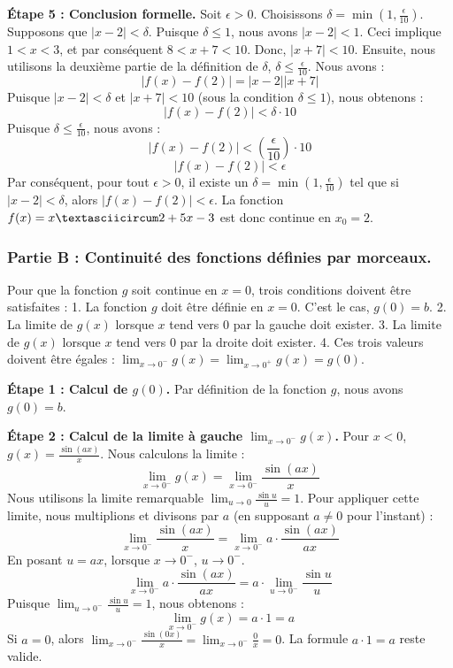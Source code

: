 \documentclass[12pt,a4paper]{report}
\begin{document}
\textbf{Étape 5 : Conclusion formelle.}
Soit $\epsilon > 0$.
Choisissons $\delta = \min\left(1, \frac{\epsilon}{10}\right)$.
Supposons que $|x - 2| < \delta$.
Puisque $\delta \le 1$, nous avons $|x - 2| < 1$.
Ceci implique $1 < x < 3$, et par conséquent $8 < x+7 < 10$.
Donc, $|x+7| < 10$.
Ensuite, nous utilisons la deuxième partie de la définition de $\delta$, $\delta \le \frac{\epsilon}{10}$.
Nous avons :
$$
|f(x) - f(2)| = |x-2||x+7|
$$
Puisque $|x-2| < \delta$ et $|x+7| < 10$ (sous la condition $\delta \le 1$), nous obtenons :
$$
|f(x) - f(2)| < \delta \cdot 10
$$
Puisque $\delta \le \frac{\epsilon}{10}$, nous avons :
$$
|f(x) - f(2)| < \left(\frac{\epsilon}{10}\right) \cdot 10
$$
$$
|f(x) - f(2)| < \epsilon
$$
Par conséquent, pour tout $\epsilon > 0$, il existe un $\delta = \min\left(1, \frac{\epsilon}{10}\right)$ tel que si $|x - 2| < \delta$, alors $|f(x) - f(2)| < \epsilon$.
La fonction $f(x) = x\textasciicircum 2 + 5x - 3$ est donc continue en $x_0 = 2$.

\subsubsection{Partie B : Continuité des fonctions définies par morceaux.}

Pour que la fonction $g$ soit continue en $x=0$, trois conditions doivent être satisfaites :
1.  La fonction $g$ doit être définie en $x=0$. C'est le cas, $g(0) = b$.
2.  La limite de $g(x)$ lorsque $x$ tend vers $0$ par la gauche doit exister.
3.  La limite de $g(x)$ lorsque $x$ tend vers $0$ par la droite doit exister.
4.  Ces trois valeurs doivent être égales : $\lim_{x \to 0^-} g(x) = \lim_{x \to 0^+} g(x) = g(0)$.

\textbf{Étape 1 : Calcul de $g(0)$.}
Par définition de la fonction $g$, nous avons $g(0) = b$.

\textbf{Étape 2 : Calcul de la limite à gauche $\lim_{x \to 0^-} g(x)$.}
Pour $x < 0$, $g(x) = \frac{\sin(ax)}{x}$.
Nous calculons la limite :
$$
\lim_{x \to 0^-} g(x) = \lim_{x \to 0^-} \frac{\sin(ax)}{x}
$$
Nous utilisons la limite remarquable $\lim_{u \to 0} \frac{\sin u}{u} = 1$.
Pour appliquer cette limite, nous multiplions et divisons par $a$ (en supposant $a \ne 0$ pour l'instant) :
$$
\lim_{x \to 0^-} \frac{\sin(ax)}{x} = \lim_{x \to 0^-} a \cdot \frac{\sin(ax)}{ax}
$$
En posant $u = ax$, lorsque $x \to 0^-$, $u \to 0^-$.
$$
\lim_{x \to 0^-} a \cdot \frac{\sin(ax)}{ax} = a \cdot \lim_{u \to 0^-} \frac{\sin u}{u}
$$
Puisque $\lim_{u \to 0^-} \frac{\sin u}{u} = 1$, nous obtenons :
$$
\lim_{x \to 0^-} g(x) = a \cdot 1 = a
$$
Si $a=0$, alors $\lim_{x \to 0^-} \frac{\sin(0x)}{x} = \lim_{x \to 0^-} \frac{0}{x} = 0$. La formule $a \cdot 1 = a$ reste valide.
\end{document}
